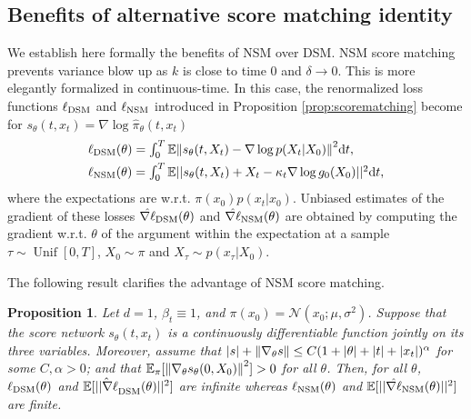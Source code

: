 \documentclass{article}
\theoremstyle{plain}
\newtheorem{proposition}[theorem]{Proposition}
\theoremstyle{definition}
\theoremstyle{remark}
\begin{document}
\subsection{Benefits of alternative score matching identity}
We establish here formally the benefits of NSM over DSM. NSM score matching prevents variance blow up as $k$ is close to time $0$ and $\delta \rightarrow 0$. This is more elegantly formalized in continuous-time. In this case, the renormalized loss functions $\ell_{\textup{DSM}}$ and $\ell_{\textup{NSM}}$ introduced in Proposition \ref{prop:scorematching} become for $s_\theta(t,x_t)=\nabla \log \hat \pi_\theta(t,x_t)$
\begin{align*}
	 & \textstyle \ell_{\textup{DSM}}(\theta)= \textstyle \int^T_0 \mathbb{E}\norm{s_\theta(t, X_t) - \nabla\log p(X_t|X_0)}^2 \dd t,          \\
	 & \textstyle \ell_{\textup{NSM}}(\theta)= \textstyle \int^T_0 \mathbb{E}||s_\theta(t, X_t)+X_t - \kappa_t \nabla\log g_0(X_0) ||^2 \dd t,
\end{align*}
where the expectations are w.r.t. $\pi(x_0)p(x_t|x_0)$.
Unbiased estimates of the gradient of these losses $\hat {\nabla \ell}_{\textup{DSM}}(\theta)$ and $\hat {\nabla \ell}_{\textup{NSM}}(\theta)$ are obtained by computing the gradient w.r.t. $\theta$ of the argument within the expectation at a sample $\tau \sim \operatorname{Unif}[0, T]$, $X_0 \sim \pi$ and $X_\tau \sim p(x_\tau|X_0)$.

The following result clarifies the advantage of NSM score matching.
\begin{proposition}
	\label{prop:guidance_loss_is_good}
	Let $d=1$, $\beta_t \equiv 1$, and $\pi(x_0) = \mathcal N(x_0;\mu, \sigma^2)$. Suppose that the score network $s_\theta(t, x_t)$ is a continuously differentiable function jointly on its three variables. Moreover, assume that $\abs{s} + \norm{\nabla_\theta s} \leq C(1 + |\theta|+ |t| + |x_t|)^{\alpha}$ for some $C, \alpha > 0$; and that $\mathbb{E}_\pi[\norm{\nabla_\theta s_\theta(0, X_0)}^2] > 0$ for all $\theta$. Then, for all $\theta$, $\ell_{\textup{DSM}}(\theta)$ and $\mathbb{E}[\hat {||\nabla \ell}_{\textup{DSM}}(\theta)||^2]$ are infinite whereas $\ell_{\textup{NSM}}(\theta)$ and $\mathbb{E}[||\hat {\nabla \ell}_{\textup{NSM}}(\theta)||^2]$ are finite.
\end{proposition}









\newcommand{\hgtheta}{\hat g_\theta}
\end{document}
